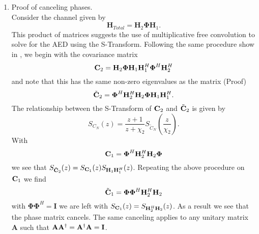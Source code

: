 \documentclass[12pt,a4paper]{report}
\begin{document}
\begin{enumerate}
\item 
Proof of canceling phases.\\
Consider the channel given by 
\begin{equation}
\mathbf{H}_{Total} = \mathbf{H}_{2}\boldsymbol{\Phi}\mathbf{H}_{1}.
\end{equation}
This product of matrices suggests the use of multiplicative free convolution to solve for the AED using the S-Transform. 
Following the same procedure show in \cite{muller2002asymptotic}, we begin with the covariance matrix
\begin{equation}
\mathbf{C}_2 = \mathbf{H}_{2}\boldsymbol{\Phi}\mathbf{H}_{1}\mathbf{H}_{1}^H\boldsymbol{\Phi}^H\mathbf{H}_{2}^H
\end{equation}
and note that this has the same non-zero eigenvalues as the matrix (Proof)
\begin{equation}
\tilde{\mathbf{C}}_2 = \boldsymbol{\Phi}^H\mathbf{H}_{2}^H\mathbf{H}_{2}\boldsymbol{\Phi}\mathbf{H}_{1}\mathbf{H}_{1}^H.
\end{equation}
The relationship between the S-Transform of $\mathbf{C}_2$ and $\tilde{\mathbf{C}}_2$ is given by 
\begin{equation}\label{rotation_property}
S_{C_N}(z) = \frac{z+1}{z+\chi_2} S_{\tilde{C}_N}(\frac{z}{\chi_2}).
\end{equation}
With \begin{equation}
\mathbf{C}_1 = \boldsymbol{\Phi}^H\mathbf{H}_{2}^H\mathbf{H}_{2}\boldsymbol{\Phi}
\end{equation}
we see that $S_{\tilde{\mathbf{C}}_2}(z) = S_{\mathbf{C}_1}(z) S_{\mathbf{H}_{1}\mathbf{H}_{1}^H}(z)$.  Repeating the above procedure on $\mathbf{C}_1$ we find
\begin{equation}
\tilde{\mathbf{C}}_{1} = \boldsymbol{\Phi}\boldsymbol{\Phi}^H\mathbf{H}_{2}^H\mathbf{H}_{2}
\end{equation}
with $\boldsymbol{\Phi}\boldsymbol{\Phi}^H = \mathbf{I}$ we are left with 
$S_{\mathbf{C}_1}(z) =  S_{\mathbf{H}_{2}^H\mathbf{H}_{2}}(z)$. As a result we see that 
the phase matrix cancels. The same canceling applies to any unitary matrix $\mathbf{A}$ such that   $\mathbf{A}\mathbf{A}^\dagger =\mathbf{A}^\dagger \mathbf{A} = \mathbf{I}$.
\end{enumerate}

\end{document}
